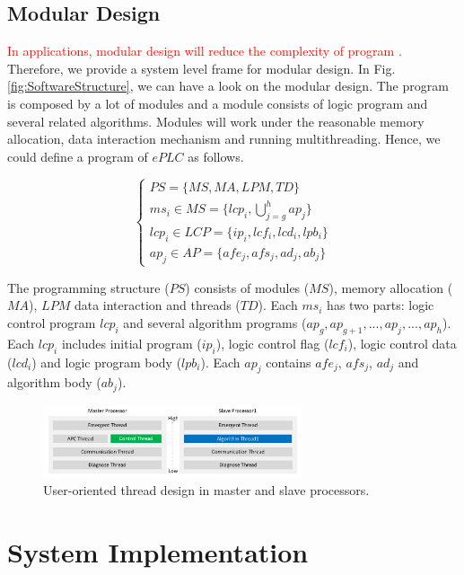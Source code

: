 \documentclass[journal,UTF8]{IEEEtran}
\begin{document}
\subsection{Modular Design}  
\textcolor{red}{In applications, modular design will reduce the complexity of program \cite{Vyatkin2013Software}.} Therefore, we provide a system level frame for modular design. In Fig. \ref{fig:SoftwareStructure}, we can have a look on the modular design. The program is composed by a lot of modules and a module consists of logic program and several related algorithms. Modules will work under the reasonable memory allocation, data interaction mechanism and running multithreading. Hence, we could define a program of $ePLC$ as follows.

\begin{equation}
	\left\{
	\begin{array}{l}
	PS = \{MS, MA , LPM, TD\}\\
	ms_i \in MS = \{lcp_i, \bigcup_{j=g}^h ap_j\}\\
	lcp_i \in LCP = \{ip_i, lcf_i, lcd_i, lpb_i\}\\
	ap_j \in AP = \{afe_j, afs_j, ad_j, ab_j\}
	\end{array}
	\right.
	\end{equation}

The programming structure ($PS$) consists of modules ($MS$), memory allocation ($MA$), $LPM$ data interaction and threads ($TD$). Each $ms_i$ has two parts: logic control program $lcp_i$ and several algorithm programs ($ap_g, ap_{g+1},..., ap_{j},..., ap_{h}$). Each $lcp_i$ includes initial program ($ip_i$), logic control flag ($lcf_i$), logic control data ($lcd_i$) and logic program body ($lpb_i$). Each $ap_{j}$ contains $afe_{j}$, $afs_{j}$, $ad_{j}$ and algorithm body ($ab_{j}$).

\begin{figure}
	\centering
	\includegraphics[width=3in]{fig/FIG5.pdf}
	\caption{ User-oriented thread design in master and slave processors.}
	\label{fig:Threads}
\end{figure}
 \section{System Implementation}
 \label{Process}
\end{document}
